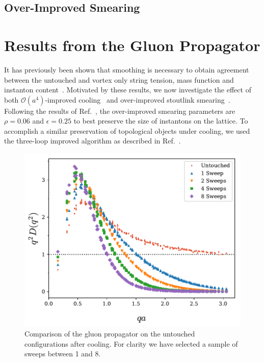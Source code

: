 \subsection{Over-Improved Smearing}

\section{Results from the Gluon Propagator}\label{sec:CoolingGluProp}
It has previously been shown that smoothing is necessary to obtain agreement between the untouched and vortex only string tension, mass function and instanton content~\cite{Trewartha:2015ida,Trewartha:2015nna,Trewartha:2017ive}. Motivated by these results, we now investigate the effect of both $\mathcal{O}(a^4)$-improved cooling~\cite{BilsonThompson:2003zi} and over-improved stoutlink smearing~\cite{Moran:2008ra}. Following the results of Ref.~\cite{Moran:2008ra}, the over-improved smearing parameters are $\rho=0.06$ and $\epsilon=0.25$ to best preserve the size of instantons on the lattice. To accomplish a similar preservation of topological objects under cooling, we used the three-loop improved algorithm as described in Ref.~\cite{BilsonThompson:2003zi}.\\
%
\begin{figure}[tb]
\centering
\includegraphics[width=\linewidth]{./ScalarGluComp_q2_1to10sweeps.pdf}
\caption{\label{fig:1to10SweepsCooling}Comparison of the gluon propagator on the untouched configurations after cooling. For clarity we have selected a sample of sweeps between 1 and 8.}
\end{figure}
%

